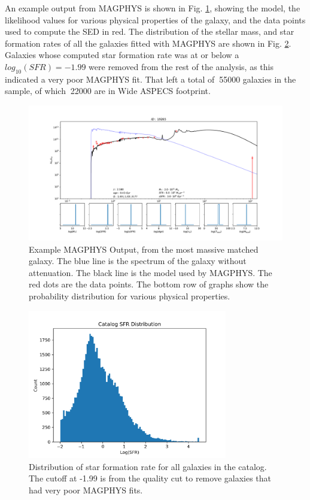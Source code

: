 An example output from MAGPHYS is shown in Fig. \ref{fig:MAGPHYS_Example}, showing the model, the likelihood values for various physical properties of the galaxy, and the data points used to compute the SED in red. The distribution of the stellar mass, and star formation rates of all the galaxies fitted with MAGPHYS are shown in Fig. \ref{fig:MAGPHYS_Properties}. Galaxies whose computed star formation rate was at or below a $log_{10}(SFR) = -1.99$ were removed from the rest of the analysis, as this indicated a very poor MAGPHYS fit. That left a total of $~$55000 galaxies in the sample, of which $~$22000 are in Wide ASPECS footprint.

\begin{figure}[tbp]
\centering \includegraphics[width=120mm]{19265.pdf}
\caption{Example MAGPHYS Output, from the most massive matched galaxy. The blue line is the spectrum of the galaxy without attenuation. The black line is the model used by MAGPHYS. The red dots are the data points. The bottom row of graphs show the probability distribution for various physical properties.}
\label{fig:MAGPHYS_Example}
\end{figure}

\begin{figure}[!tbp]
\centering \includegraphics[width=87mm]{Survey/MAGPHYS_SFR.png}
\caption{Distribution of star formation rate for all galaxies in the catalog. The cutoff at -1.99 is from the quality cut to remove galaxies that had very poor MAGPHYS fits.}
\label{fig:MAGPHYS_Properties}
\end{figure}

